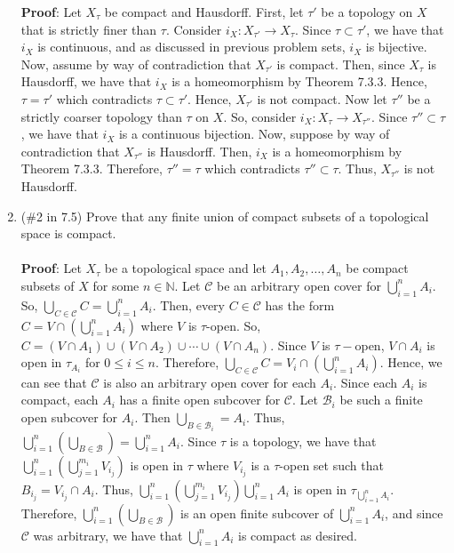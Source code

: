 \documentclass[12pt]{article}
\begin{document}
\begin{enumerate}
\textbf{Proof}:  Let $X_{\tau}$ be compact and Hausdorff. First, let $\tau'$ be a topology on $X$ that is strictly finer than $\tau$. Consider $i_X: X_{\tau'}\rightarrow X_{\tau}$. Since $\tau\subset\tau'$, we have that $i_X$ is continuous, and as discussed in previous problem sets, $i_X$ is bijective. Now, assume by way of contradiction that $X_{\tau'}$ is compact. Then, since $X_{\tau}$ is Hausdorff, we have that $i_X$ is a homeomorphism by Theorem 7.3.3. Hence, $\tau=\tau'$ which contradicts $\tau\subset\tau'$. Hence, $X_{\tau'}$ is not compact. Now let $\tau''$ be a strictly coarser topology than $\tau$ on $X$. So, consider $i_X:X_{\tau}\rightarrow X_{\tau''}$. Since $\tau''\subset\tau$, we have that $i_X$ is a continuous bijection. Now, suppose by way of contradiction that $X_{\tau''}$ is Hausdorff. Then, $i_X$ is a homeomorphism by Theorem 7.3.3. Therefore, $\tau''=\tau$ which contradicts $\tau''\subset\tau$. Thus, $X_{\tau''}$ is not Hausdorff.\\[20pt]

\item (\#2 in 7.5) Prove that any finite union of compact subsets of a topological space is compact.\\\\

\textbf{Proof}: Let $X_{\tau}$ be a topological space and let $A_1, A_2,\ldots, A_n$ be compact subsets of $X$ for some $n\in\mathbb{N}$. Let $\mathcal{C}$ be an arbitrary open cover for $\bigcup_{i=1}^nA_i$. So, $\bigcup_{C\in\mathcal{C}}C=\bigcup_{i=1}^nA_i$. Then, every $C\in\mathcal{C}$ has the form $C=V\cap(\bigcup_{i=1}^nA_i)$ where $V$ is $\tau$-open. So, $C=(V\cap A_1)\cup(V\cap A_2)\cup\cdots\cup(V\cap A_n)$. Since $V$ is $\tau-$open, $V\cap A_i$ is open in $\tau_{A_i}$ for $0\leq i\leq n$. Therefore, $\bigcup_{C\in\mathcal{C}}C=V_i\cap(\bigcup_{i=1}^nA_i)$. Hence, we can see that $\mathcal{C}$ is also an arbitrary open cover for each $A_i$. Since each $A_i$ is compact, each $A_i$ has a finite open subcover for $\mathcal{C}$. Let $\mathcal{B}_i$ be such a finite open subcover for $A_i$. Then $\bigcup_{B\in\mathcal{B}_i}=A_i$. Thus, $\bigcup_{i=1}^n(\bigcup_{B\in\mathcal{B}})=\bigcup_{i=1}^nA_i$. Since $\tau$ is a topology, we have that $\bigcup_{i=1}^n(\bigcup_{j=1}^{m_i}V_{i_j})$ is open in $\tau$ where $V_{i_j}$ is a $\tau$-open set such that $B_{i_j}=V_{i_j}\cap A_i$. Thus, $\bigcup_{i=1}^n(\bigcup_{j=1}^{m_i}V_{i_j})\bigcup_{i=1}^nA_i$ is open in $\tau_{\bigcup_{i=1}^nA_i}$. Therefore, $\bigcup_{i=1}^n(\bigcup_{B\in\mathcal{B}})$ is an open finite subcover of $\bigcup_{i=1}^nA_i$, and since $\mathcal{C}$ was arbitrary, we have that $\bigcup_{i=1}^nA_i$ is compact as desired.\\[20pt]


\end{enumerate}
\end{document}

